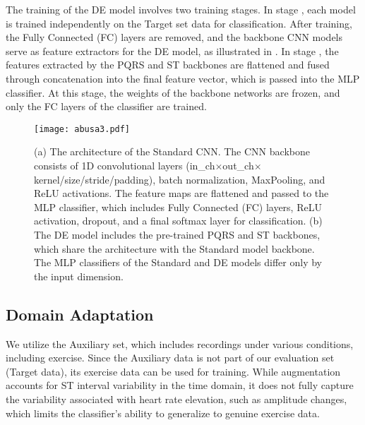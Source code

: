 The training of the DE model involves two training stages. In stage \uppercase\expandafter{}, each model is trained independently on the Target set data for classification. After training, the Fully Connected (FC) layers are removed, and the backbone CNN models serve as feature extractors for the DE model, as illustrated in .
In stage \uppercase\expandafter{}, the features extracted by the PQRS and ST backbones are flattened and fused through concatenation into the final feature vector, which is passed into the MLP classifier. At this stage, the weights of the backbone networks are frozen, and only the FC layers of the classifier are trained.

\begin{figure}[!t]
    \centering
    \texttt{[image: abusa3.pdf]}
    \caption{(a) The architecture of the Standard CNN. The CNN backbone consists of 1D convolutional layers (in\_ch$\times$out\_ch$\times$kernel/size/stride/padding),
    batch normalization, MaxPooling, and ReLU activations. The feature maps are flattened and passed to the MLP classifier, which includes Fully Connected (FC) layers, ReLU activation, dropout, and a final softmax layer for classification. (b) The DE model includes the pre-trained PQRS and ST backbones, which share the architecture with the Standard model backbone. The MLP classifiers of the Standard and DE models differ only by the input dimension.}
    \label{fig:standard_dual_models}
\end{figure}
\subsection{Domain Adaptation}
We utilize the Auxiliary set, which includes recordings under various conditions, including exercise. Since the Auxiliary data is not part of our evaluation set (Target data), its exercise data can be used for training. While augmentation accounts for ST interval variability in the time domain, it does not fully capture the variability associated with heart rate elevation, such as amplitude changes, which limits the classifier's ability to generalize to genuine exercise data.


